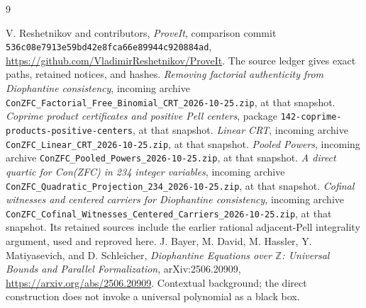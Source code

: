 \documentclass[11pt]{article}
\theoremstyle{remark}\newtheorem{remark}[theorem]{Remark}
\newcommand{\file}[1]{\nolinkurl{#1}}
\begin{document}
\clearpage
\begin{thebibliography}{9}
\small\raggedright\setlength{\itemsep}{3pt}
 V. Reshetnikov and contributors, \emph{ProveIt}, comparison
commit \file{536c08e7913e59bd42e8fca66e89944c920884ad},
\url{https://github.com/VladimirReshetnikov/ProveIt}.
The source ledger gives exact paths, retained notices, and hashes.
 \emph{Removing factorial authenticity from
Diophantine consistency}, incoming archive
\file{ConZFC_Factorial_Free_Binomial_CRT_2026-10-25.zip}, at that snapshot.
 \emph{Coprime product certificates and positive Pell
centers}, package \file{142-coprime-products-positive-centers},
at that snapshot.
 \emph{Linear CRT}, incoming archive
\file{ConZFC_Linear_CRT_2026-10-25.zip}, at that snapshot.
 \emph{Pooled Powers}, incoming archive
\file{ConZFC_Pooled_Powers_2026-10-25.zip}, at that snapshot.
 \emph{A direct quartic for Con(ZFC) in 234 integer
variables}, incoming archive
\file{ConZFC_Quadratic_Projection_234_2026-10-25.zip}, at that snapshot.
 \emph{Cofinal witnesses and centered carriers for
Diophantine consistency}, incoming archive
\file{ConZFC_Cofinal_Witnesses_Centered_Carriers_2026-10-25.zip},
at that snapshot. Its retained sources include the earlier rational
adjacent-Pell integrality argument, used and reproved here.
 J. Bayer, M. David, M. Hassler, Y. Matiyasevich, and
D. Schleicher, \emph{Diophantine Equations over $\mathbb Z$: Universal
Bounds and Parallel Formalization}, arXiv:2506.20909,
\url{https://arxiv.org/abs/2506.20909}. Contextual background; the
direct construction does not invoke a universal polynomial as a black box.
\end{thebibliography}
\end{document}
